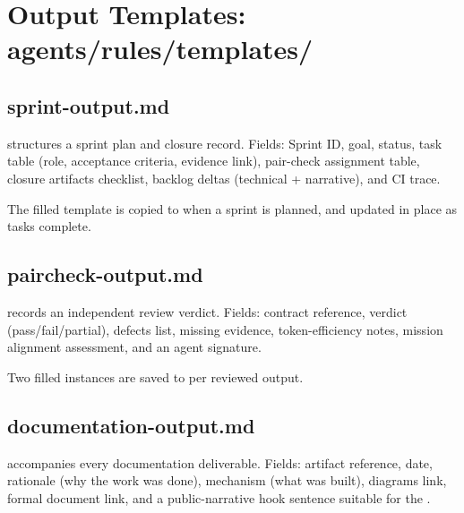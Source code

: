\documentclass[a4paper,11pt,openany]{report}
\begin{document}


\chapter{Output Templates: agents/rules/templates/}
\label{ch:templates}


\section{sprint-output.md}

 structures a sprint plan and closure
record. Fields: Sprint ID, goal, status, task table (role, acceptance criteria,
evidence link), pair-check assignment table, closure artifacts checklist,
backlog deltas (technical + narrative), and CI trace.

The filled template is copied to  when a sprint
is planned, and updated in place as tasks complete.

\section{paircheck-output.md}

 records an independent review
verdict. Fields: contract reference, verdict (pass/fail/partial), defects list,
missing evidence, token-efficiency notes, mission alignment assessment, and an
agent signature.

Two filled instances are saved to  per reviewed output.

\section{documentation-output.md}

 accompanies every documentation
deliverable. Fields: artifact reference, date, rationale (why the work was
done), mechanism (what was built), diagrams link, formal document link, and a
public-narrative hook sentence suitable for the .
\end{document}
